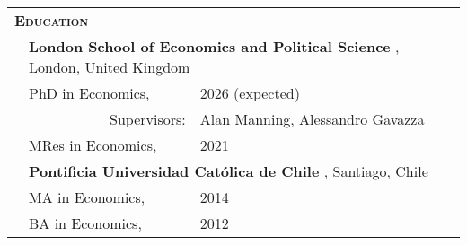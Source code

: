\begin{tabular}{lll}

	\multicolumn{3}{l}{
		\large
		\textbf{%
			\textsc{%
				Education
			}
		}
	}
	\\[2ex]

	\indent
	&
	\multicolumn{2}{l}{
		\textbf{%
			London School of Economics and Political Science%
		}%
		,
		London,
		United Kingdom
	}
	\\[.5ex]
	
	  
	& PhD in Economics,
	& 2026 (expected)
	\\[-.5ex]
	
	& \multicolumn{1}{r}{\footnotesize Supervisors:}
	& \footnotesize Alan Manning, Alessandro Gavazza
	\\[0ex]
	  
	& MRes in Economics,
	& 2021
	\\[1em]
	
	&
	\multicolumn{2}{l}{
		\textbf{%
			Pontificia Universidad Cat\'olica de Chile%
		}%
		,
		Santiago,
		Chile
	}
	\\[.5ex]
	
	  
	& MA in Economics,
	& 2014
	\\
	
	  
	& BA in Economics,
	& 2012
	
\end{tabular}